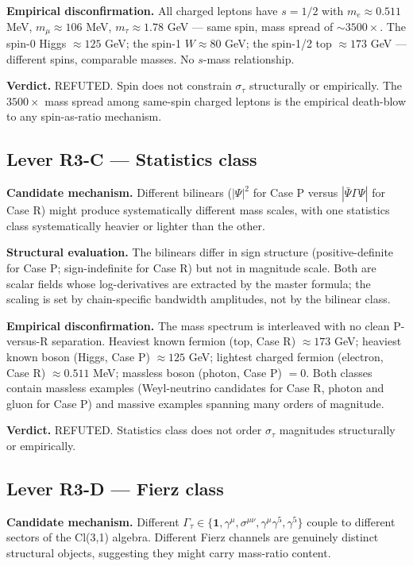 \documentclass[11pt,a4paper]{article}
\begin{document}
\textbf{Empirical disconfirmation.} All charged leptons have $s = 1/2$ with $m_e \approx 0.511$ MeV, $m_\mu \approx 106$ MeV, $m_\tau \approx 1.78$ GeV --- same spin, mass spread of $\sim 3500\times$. The spin-0 Higgs $\approx 125$ GeV; the spin-1 $W \approx 80$ GeV; the spin-1/2 top $\approx 173$ GeV --- different spins, comparable masses. No $s$-mass relationship.

\textbf{Verdict.} REFUTED. Spin does not constrain $\sigma_\tau$ structurally or empirically. The $3500\times$ mass spread among same-spin charged leptons is the empirical death-blow to any spin-as-ratio mechanism.

\subsection{Lever R3-C --- Statistics class}

\textbf{Candidate mechanism.} Different bilinears ($|\Psi|^2$ for Case P versus $|\bar\Psi\Gamma\Psi|$ for Case R) might produce systematically different mass scales, with one statistics class systematically heavier or lighter than the other.

\textbf{Structural evaluation.} The bilinears differ in sign structure (positive-definite for Case P; sign-indefinite for Case R) but not in magnitude scale. Both are scalar fields whose log-derivatives are extracted by the master formula; the scaling is set by chain-specific bandwidth amplitudes, not by the bilinear class.

\textbf{Empirical disconfirmation.} The mass spectrum is interleaved with no clean P-versus-R separation. Heaviest known fermion (top, Case R) $\approx 173$ GeV; heaviest known boson (Higgs, Case P) $\approx 125$ GeV; lightest charged fermion (electron, Case R) $\approx 0.511$ MeV; massless boson (photon, Case P) $= 0$. Both classes contain massless examples (Weyl-neutrino candidates for Case R, photon and gluon for Case P) and massive examples spanning many orders of magnitude.

\textbf{Verdict.} REFUTED. Statistics class does not order $\sigma_\tau$ magnitudes structurally or empirically.

\subsection{Lever R3-D --- Fierz class}

\textbf{Candidate mechanism.} Different $\Gamma_\tau \in \{\mathbf{1}, \gamma^\mu, \sigma^{\mu\nu}, \gamma^\mu\gamma^5, \gamma^5\}$ couple to different sectors of the Cl(3,1) algebra. Different Fierz channels are genuinely distinct structural objects, suggesting they might carry mass-ratio content.
\end{document}
